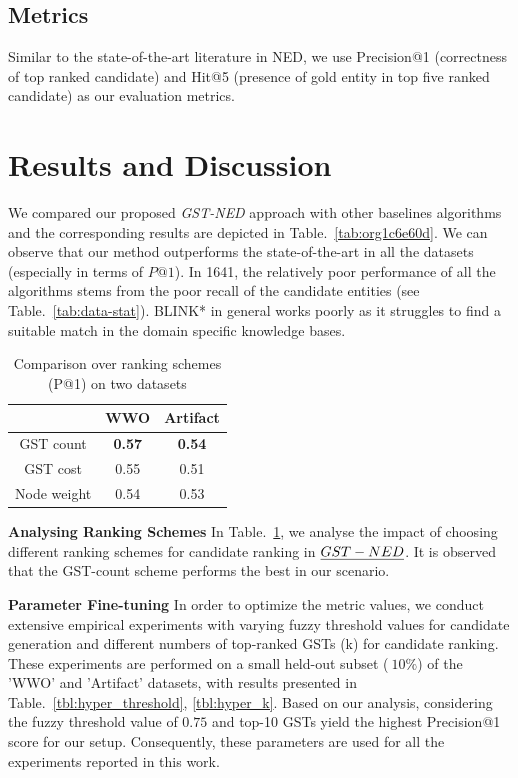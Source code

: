 \documentclass[11pt]{article}
\begin{document}

\subsection{Metrics}
Similar to the state-of-the-art literature in NED, we use Precision@1 (correctness of top ranked candidate) and Hit@5 (presence of gold entity in top five ranked candidate) as our evaluation metrics.

\section{Results and Discussion}
We compared our proposed \emph{GST-NED} approach with other baselines algorithms and the corresponding results are depicted in Table.~\ref{tab:org1c6e60d}. We can observe that our method outperforms the state-of-the-art in all the datasets (especially in terms of $P@1$). In 1641, the relatively poor performance of all the algorithms stems from the poor recall of the candidate entities (see Table.~\ref{tab:data-stat}). BLINK* in general works poorly as it struggles to find a suitable match in the domain specific knowledge bases.

\begin{table}[htbp]
    \centering
    \begin{tabular}{c|c|c}
     & WWO	& Artifact \\
    \hline
    GST count	& \textbf{0.57} & \textbf{0.54} \\
    GST cost	& 0.55 & 0.51 \\
    Node weight	& 0.54 & 0.53 \\
    \end{tabular}
    \caption{Comparison over ranking schemes (P@1) on two datasets}
    \label{tab:abl_tab}
\end{table}

\noindent
\textbf{Analysing Ranking Schemes}
 In Table.~\ref{tab:abl_tab}, we analyse the impact of choosing different ranking schemes for candidate ranking in $\emph{GST-NED}$. It is observed that the GST-count scheme performs the best in our scenario.

\noindent
\textbf{Parameter Fine-tuning}
In order to optimize the metric values, we conduct extensive empirical experiments with varying fuzzy threshold values for candidate generation and different numbers of top-ranked GSTs (k) for candidate ranking. These experiments are performed on a small held-out subset ($~10\%$) of the 'WWO' and 'Artifact' datasets, with results presented in Table.~\ref{tbl:hyper_threshold}, \ref{tbl:hyper_k}.
Based on our analysis, considering the fuzzy threshold value of $0.75$ and top-10 GSTs yield the highest Precision@1 score for our setup. Consequently, these parameters are used for all the experiments reported in this work.
 
\end{document}
